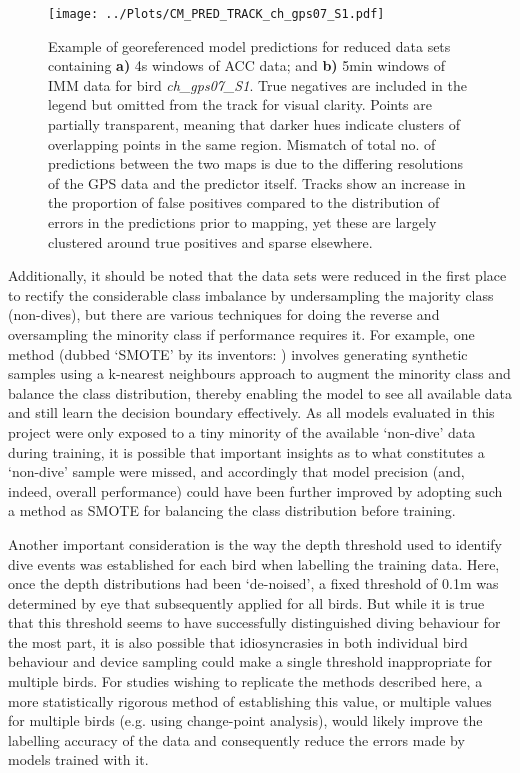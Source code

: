 \documentclass[11pt]{article}
\begin{document}
    \begin{figure}
	    \centering\texttt{[image: ../Plots/CM\_PRED\_TRACK\_ch\_gps07\_S1.pdf]}
	    \caption{Example of georeferenced model predictions for reduced data sets containing \textbf{a)} 4s windows of ACC data; and \textbf{b)} 5min windows of IMM data for bird \emph{ch\_gps07\_S1}. True negatives are included in the legend but omitted from the track for visual clarity. Points are partially transparent, meaning that darker hues indicate clusters of overlapping points in the same region. Mismatch of total no. of predictions between the two maps is due to the differing resolutions of the GPS data and the predictor itself. Tracks show an increase in the proportion of false positives compared to the distribution of errors in the predictions prior to mapping, yet these are largely clustered around true positives and sparse elsewhere.}
    \end{figure}
    
    Additionally, it should be noted that the data sets were reduced in the first place to rectify the considerable class imbalance by undersampling the majority class (non-dives), but there are various techniques for doing the reverse and oversampling the minority class if performance requires it. For example, one method (dubbed ‘SMOTE’ by its inventors: \cite{chawla2002smote}) involves generating synthetic samples using a k-nearest neighbours approach to augment the minority class and balance the class distribution, thereby enabling the model to see all available data and still learn the decision boundary effectively. As all models evaluated in this project were only exposed to a tiny minority of the available ‘non-dive’ data during training, it is possible that important insights as to what constitutes a ‘non-dive’ sample were missed, and accordingly that model precision (and, indeed, overall performance) could have been further improved by adopting such a method as SMOTE for balancing the class distribution before training.
    
    Another important consideration is the way the depth threshold used to identify dive events was established for each bird when labelling the training data. Here, once the depth distributions had been ‘de-noised’,  a fixed threshold of 0.1m was determined by eye that subsequently applied for all birds. But while it is true that this threshold seems to have successfully distinguished diving behaviour for the most part, it is also possible that idiosyncrasies in both individual bird behaviour and device sampling could make a single threshold inappropriate for multiple birds. 
    For studies wishing to replicate the methods described here, a more statistically rigorous method of establishing this value, or multiple values for multiple birds (e.g. using change-point analysis), would likely improve the labelling accuracy of the data and consequently reduce the errors made by models trained with it.
    
\end{document}
